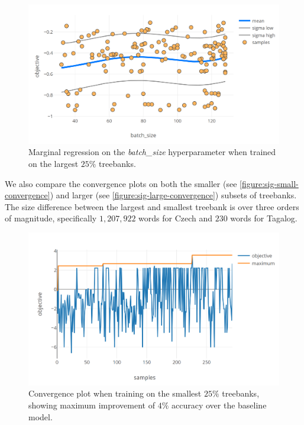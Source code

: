 \begin{figure}
	\begin{center}
		\includegraphics[width=1.0\textwidth]{images/sig-large-batch.png}
		\caption{Marginal regression on the \emph{batch\_size} hyperparameter when trained on the largest $25\%$ treebanks.}
		\label{figure:sig-large-batch}
	\end{center}
\end{figure}

We also compare the convergence plots on both the smaller (see
\autoref{figure:sig-small-convergence}) and larger (see
\autoref{figure:sig-large-convergence}) subsets of treebanks. The size
difference between the largest and smallest treebank is over three orders of
magnitude, specifically $1,207,922$ words for Czech and $230$ words for
Tagalog.


\begin{figure}
	\begin{center}
		\includegraphics[width=1.0\textwidth]{images/sig-small-convergence.png}
		\caption{Convergence plot when training on the smallest $25\%$ treebanks, showing maximum improvement of $4\%$ accuracy over the baseline model.}
		\label{figure:sig-small-convergence}
	\end{center}
\end{figure}


